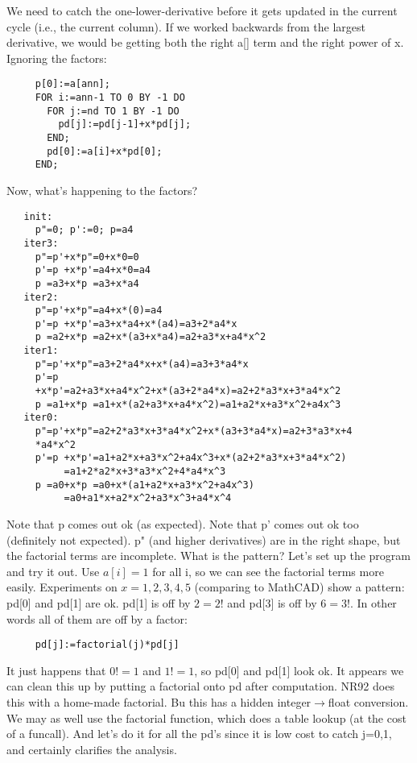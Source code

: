 We need to catch the one-lower-derivative before it gets
updated in the current cycle (i.e., the current column).  If
we worked backwards from the largest derivative, we would be
getting both the right a[] term and the right power of x.
Ignoring the factors:
\begin{verbatim}
     p[0]:=a[ann];
     FOR i:=ann-1 TO 0 BY -1 DO
       FOR j:=nd TO 1 BY -1 DO
         pd[j]:=pd[j-1]+x*pd[j];
       END;
       pd[0]:=a[i]+x*pd[0];
     END;
\end{verbatim}

Now, what's happening to the factors?
\begin{verbatim}
   init:
     p"=0; p':=0; p=a4
   iter3:
     p"=p'+x*p"=0+x*0=0
     p'=p +x*p'=a4+x*0=a4
     p =a3+x*p =a3+x*a4
   iter2:
     p"=p'+x*p"=a4+x*(0)=a4
     p'=p +x*p'=a3+x*a4+x*(a4)=a3+2*a4*x
     p =a2+x*p =a2+x*(a3+x*a4)=a2+a3*x+a4*x^2
   iter1:
     p"=p'+x*p"=a3+2*a4*x+x*(a4)=a3+3*a4*x
     p'=p
     +x*p'=a2+a3*x+a4*x^2+x*(a3+2*a4*x)=a2+2*a3*x+3*a4*x^2
     p =a1+x*p =a1+x*(a2+a3*x+a4*x^2)=a1+a2*x+a3*x^2+a4x^3
   iter0:
     p"=p'+x*p"=a2+2*a3*x+3*a4*x^2+x*(a3+3*a4*x)=a2+3*a3*x+4
     *a4*x^2
     p'=p +x*p'=a1+a2*x+a3*x^2+a4x^3+x*(a2+2*a3*x+3*a4*x^2)
          =a1+2*a2*x+3*a3*x^2+4*a4*x^3
     p =a0+x*p =a0+x*(a1+a2*x+a3*x^2+a4x^3)
          =a0+a1*x+a2*x^2+a3*x^3+a4*x^4
\end{verbatim}

Note that p comes out ok (as expected).  Note that p' comes
out ok too (definitely not expected).  p" (and higher
derivatives) are in the right shape, but the factorial terms
are incomplete.  What is the pattern?  Let's set up the
program and try it out.  Use $a[i]=1$ for all i, so we can see
the factorial terms more easily.  Experiments on
$x=1,2,3,4,5$ (comparing to MathCAD) show a pattern:  pd[0]
and pd[1] are ok.  pd[1] is off by $2=2!$ and pd[3] is off by
$6=3!$.  In other words all of them are off by a factor:
\begin{verbatim}
     pd[j]:=factorial(j)*pd[j]
\end{verbatim}

It just happens that $0!=1$ and $1!=1$, so pd[0] and pd[1] look
ok.  It appears we can clean this up by putting a factorial
onto pd after computation.  NR92 does this with a home-made
factorial.  Bu this has a hidden integer$\rightarrow$float conversion.
We may as well use the factorial function, which does a
table lookup (at the cost of a funcall).  And let's do it
for all the pd's since it is low cost to catch j=0,1, and
certainly clarifies the analysis.


